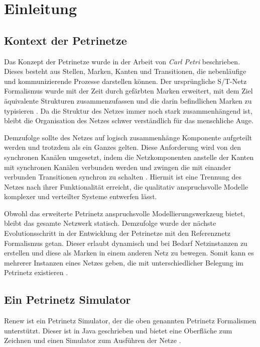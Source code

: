 \chapter{Einleitung}

\section{Kontext der Petrinetze} \label{sec:KdP} 

Das Konzept der Petrinetze wurde in der Arbeit von \textit{Carl Petri} beschrieben. Dieses besteht aus Stellen, Marken, Kanten und Transitionen, die nebenläufige und kommunizierende Prozesse darstellen können. Der ursprüngliche S/T-Netz Formalismus wurde mit der Zeit durch gefärbten Marken erweitert, mit dem Ziel äquivalente Strukturen zusammenzufassen und die darin befindlichen Marken zu typisieren \cite{kummerReferenznetze}. Da die Struktur des Netzes immer noch stark zusammenhängend ist, bleibt die Organisation des Netzes schwer verständlich für das menschliche Auge.\bigbreak

Demzufolge sollte des Netzes auf logisch zusammenhänge Komponente aufgeteilt werden und trotzdem als ein Ganzes gelten. Diese Anforderung wird von den synchronen Kanälen umgesetzt, indem die Netzkomponenten anstelle der Kanten mit synchronen Kanälen verbunden werden und zwingen die mit einander verbunden Transitionen synchron zu schalten \cite{kummerReferenznetze}. Hiermit ist eine Trennung des Netzes nach ihrer Funktionalität erreicht, die qualitativ anspruchsvolle Modelle komplexer und verteilter Systeme entwerfen lässt.\bigbreak

Obwohl das erweiterte Petrinetz anspruchsvolle Modellierungswerkzeug bietet, bleibt das gesamte Netzwerk statisch. Demzufolge wurde der nächste Evolutionsschritt in der Entwicklung der Petrinetze mit den Referenznetz Formalismus getan. Dieser erlaubt dynamisch und bei Bedarf Netzinstanzen zu erstellen und diese als Marken in einem anderen Netz zu bewegen. Somit kann es mehrerer Instanzen eines Netzes geben, die mit unterschiedlicher Belegung im Petrinetz existieren \cite{kummerReferenznetze}.

\section{Ein Petrinetz Simulator} \label{sec:EPS}

Renew ist ein Petrinetz Simulator, der die oben genannten Petrinetz Formalismen unterstützt. Dieser ist in Java geschrieben und bietet eine Oberfläche zum Zeichnen und einen Simulator zum Ausführen der Netze \cite{userGuide}.\bigbreak

